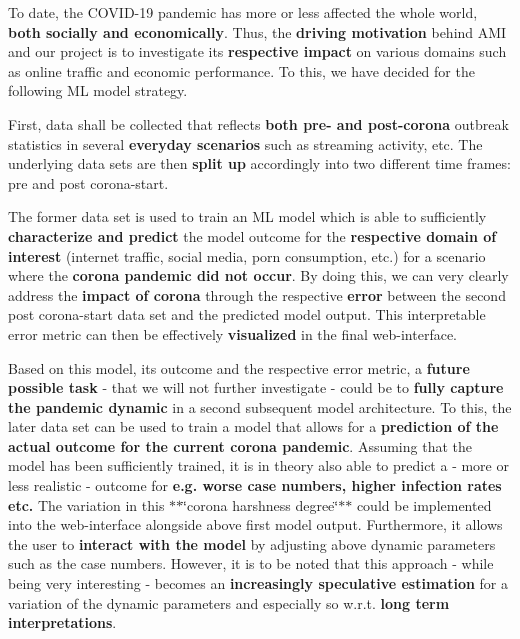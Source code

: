 To date, the C\+O\+V\+I\+D-\/19 pandemic has more or less affected the whole world, {\bfseries{both socially and economically}}. Thus, the {\bfseries{driving motivation}} behind A\+MI and our project is to investigate its {\bfseries{respective impact}} on various domains such as online traffic and economic performance. To this, we have decided for the following ML model strategy. ~\newline


First, data shall be collected that reflects {\bfseries{both pre-\/ and post-\/corona}} outbreak statistics in several {\bfseries{everyday scenarios}} such as streaming activity, etc. The underlying data sets are then {\bfseries{split up}} accordingly into two different time frames\+: pre and post corona-\/start.

The former data set is used to train an ML model which is able to sufficiently {\bfseries{characterize and predict}} the model outcome for the {\bfseries{respective domain of interest}} (internet traffic, social media, porn consumption, etc.) for a scenario where the {\bfseries{corona pandemic did not occur}}. By doing this, we can very clearly address the {\bfseries{impact of corona}} through the respective {\bfseries{error}} between the second post corona-\/start data set and the predicted model output. This interpretable error metric can then be effectively {\bfseries{visualized}} in the final web-\/interface.

Based on this model, its outcome and the respective error metric, a {\bfseries{future possible task}} -\/ that we will not further investigate -\/ could be to {\bfseries{fully capture the pandemic dynamic}} in a second subsequent model architecture. To this, the later data set can be used to train a model that allows for a {\bfseries{prediction of the actual outcome for the current corona pandemic}}. Assuming that the model has been sufficiently trained, it is in theory also able to predict a -\/ more or less realistic -\/ outcome for {\bfseries{e.\+g. worse case numbers, higher infection rates etc.}} The variation in this $\ast$$\ast$\char`\"{}corona harshness degree\char`\"{}$\ast$$\ast$ could be implemented into the web-\/interface alongside above first model output. Furthermore, it allows the user to {\bfseries{interact with the model}} by adjusting above dynamic parameters such as the case numbers. However, it is to be noted that this approach -\/ while being very interesting -\/ becomes an {\bfseries{increasingly speculative estimation}} for a variation of the dynamic parameters and especially so w.\+r.\+t. {\bfseries{long term interpretations}}. ~\newline


